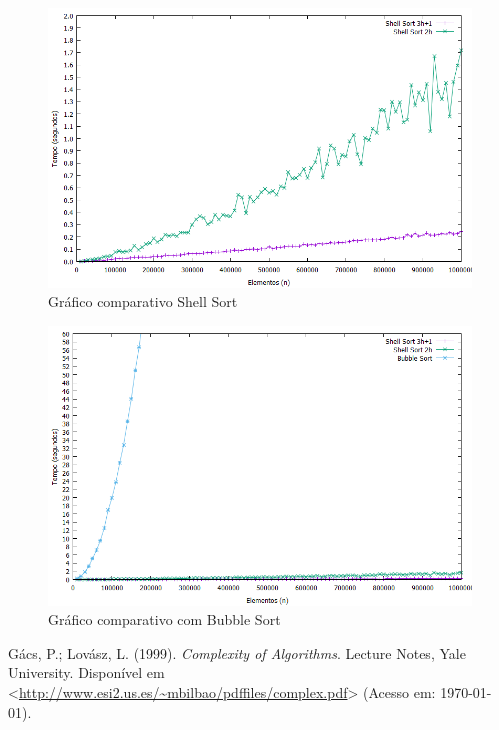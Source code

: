 \documentclass[titlepage,12pt,a4paper]{article}
\begin{document}
    \begin{figure}[h]
      \caption{Gráfico comparativo Shell Sort \label{fig:grafs1s2}}
      \includegraphics[width=\textwidth]{../data/plots/plot_S1S2_O2.png}
    \end{figure}

    \begin{figure}[h]
      \caption{Gráfico comparativo com Bubble Sort \label{fig:grafs1s2b}}
      \includegraphics[width=\textwidth]{../data/plots/plot_S1S2B_O2.png}
    \end{figure}

  \FloatBarrier

  \begin{thebibliography}{9}

      Gács, P.;
      Lovász, L.
      (1999).
      \emph{Complexity of Algorithms}.
      Lecture Notes,
      Yale University.
      Disponível em \textless\url{http://www.esi2.us.es/~mbilbao/pdffiles/complex.pdf}\textgreater%
      (Acesso em: \today).

  \end{thebibliography}
\end{document}
